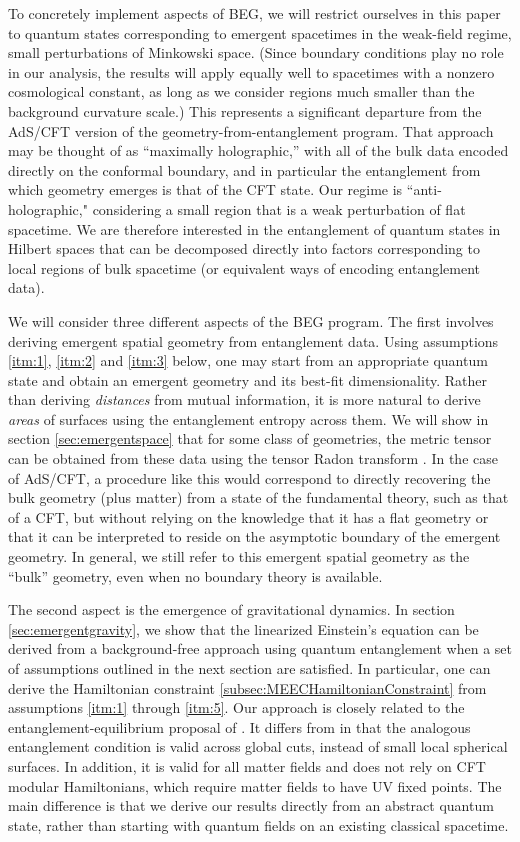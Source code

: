 \documentclass[%
12pt,preprint,
nofootinbib,
amsmath,amssymb,
aps,
prd,
showpacs,
superscriptaddress
]{revtex4-2}
\begin{document}
To concretely implement aspects of BEG, we will restrict ourselves in this paper to quantum states corresponding to emergent spacetimes in the weak-field regime, small perturbations of Minkowski space.
(Since boundary conditions play no role in our analysis, the results will apply equally well to spacetimes with a nonzero cosmological constant, as long as we consider regions much smaller than the background curvature scale.)
This represents a significant departure from the AdS/CFT version of the geometry-from-entanglement program. 
That approach may be thought of as ``maximally holographic,'' with all of the bulk data encoded directly on the conformal boundary, and in particular the entanglement from which geometry emerges is that of the CFT state.
Our regime is ``anti-holographic," considering a small region that is a weak perturbation of flat spacetime.
We are therefore interested in the entanglement of quantum states in Hilbert spaces that can be decomposed directly into factors corresponding to local regions of bulk spacetime (or equivalent ways of encoding entanglement data).

We will consider three different aspects of the BEG program. 
The first involves deriving emergent spatial geometry from entanglement data.
Using assumptions \ref{itm:1}, \ref{itm:2} and \ref{itm:3} below, one may start from an appropriate quantum state and obtain an emergent geometry and its best-fit dimensionality. 
Rather than deriving \emph{distances} from mutual information, it is more natural to derive \emph{areas} of surfaces using the entanglement entropy across them.
We will show in section \ref{sec:emergentspace} that for some class of geometries, the metric tensor can be obtained from these data using the tensor Radon transform \cite{sharafutdinov1994integral}. In the case of AdS/CFT, a procedure like this would correspond to directly recovering the bulk geometry (plus matter) from a state of the fundamental theory, such as that of a CFT, but without relying on the knowledge that it has a flat geometry or that it can be interpreted to reside on the asymptotic boundary of the emergent geometry. In general, we still refer to this emergent spatial geometry as the ``bulk'' geometry, even when no boundary theory is available. 

The second aspect is the emergence of gravitational dynamics.
In section \ref{sec:emergentgravity}, we show that the linearized Einstein's equation can be derived from a background-free approach using quantum entanglement when a set of assumptions outlined in the next section are satisfied. 
In particular, one can derive the Hamiltonian constraint \ref{subsec:MEECHamiltonianConstraint} from assumptions \ref{itm:1} through \ref{itm:5}. 
Our approach is closely related to the entanglement-equilibrium proposal of \cite{Jacobson:2015hqa}. It differs from \cite{Jacobson:2015hqa} in that the analogous entanglement condition is valid across global cuts, instead of small local spherical surfaces. In addition, it is valid for all matter fields and does not rely on CFT modular Hamiltonians, which require matter fields to have UV fixed points.
The main difference is that we derive our results directly from an abstract quantum state, rather than starting with quantum fields on an existing classical spacetime. 
\end{document}
